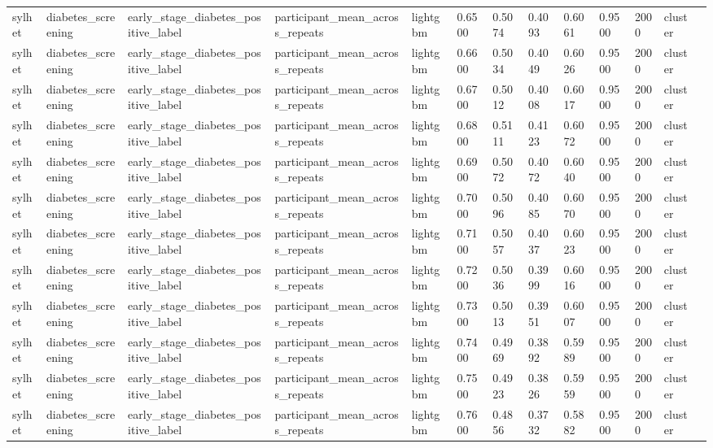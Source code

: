 \begin{tabular}{lllllllllllll}
sylhet & diabetes\_screening & early\_stage\_diabetes\_positive\_label & participant\_mean\_across\_repeats & lightgbm & 0.6500 & 0.5074 & 0.4093 & 0.6061 & 0.9500 & 2000 & cluster &  \\
sylhet & diabetes\_screening & early\_stage\_diabetes\_positive\_label & participant\_mean\_across\_repeats & lightgbm & 0.6600 & 0.5034 & 0.4049 & 0.6026 & 0.9500 & 2000 & cluster &  \\
sylhet & diabetes\_screening & early\_stage\_diabetes\_positive\_label & participant\_mean\_across\_repeats & lightgbm & 0.6700 & 0.5012 & 0.4008 & 0.6017 & 0.9500 & 2000 & cluster &  \\
sylhet & diabetes\_screening & early\_stage\_diabetes\_positive\_label & participant\_mean\_across\_repeats & lightgbm & 0.6800 & 0.5111 & 0.4123 & 0.6072 & 0.9500 & 2000 & cluster &  \\
sylhet & diabetes\_screening & early\_stage\_diabetes\_positive\_label & participant\_mean\_across\_repeats & lightgbm & 0.6900 & 0.5072 & 0.4072 & 0.6040 & 0.9500 & 2000 & cluster &  \\
sylhet & diabetes\_screening & early\_stage\_diabetes\_positive\_label & participant\_mean\_across\_repeats & lightgbm & 0.7000 & 0.5096 & 0.4085 & 0.6070 & 0.9500 & 2000 & cluster &  \\
sylhet & diabetes\_screening & early\_stage\_diabetes\_positive\_label & participant\_mean\_across\_repeats & lightgbm & 0.7100 & 0.5057 & 0.4037 & 0.6023 & 0.9500 & 2000 & cluster &  \\
sylhet & diabetes\_screening & early\_stage\_diabetes\_positive\_label & participant\_mean\_across\_repeats & lightgbm & 0.7200 & 0.5036 & 0.3999 & 0.6016 & 0.9500 & 2000 & cluster &  \\
sylhet & diabetes\_screening & early\_stage\_diabetes\_positive\_label & participant\_mean\_across\_repeats & lightgbm & 0.7300 & 0.5013 & 0.3951 & 0.6007 & 0.9500 & 2000 & cluster &  \\
sylhet & diabetes\_screening & early\_stage\_diabetes\_positive\_label & participant\_mean\_across\_repeats & lightgbm & 0.7400 & 0.4969 & 0.3892 & 0.5989 & 0.9500 & 2000 & cluster &  \\
sylhet & diabetes\_screening & early\_stage\_diabetes\_positive\_label & participant\_mean\_across\_repeats & lightgbm & 0.7500 & 0.4923 & 0.3826 & 0.5959 & 0.9500 & 2000 & cluster &  \\
sylhet & diabetes\_screening & early\_stage\_diabetes\_positive\_label & participant\_mean\_across\_repeats & lightgbm & 0.7600 & 0.4856 & 0.3732 & 0.5882 & 0.9500 & 2000 & cluster &  \\

\end{tabular}
